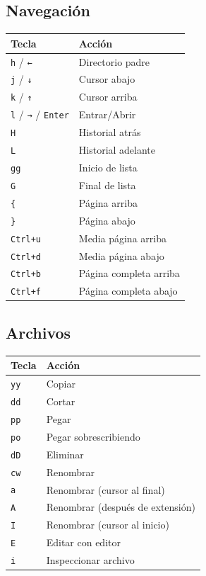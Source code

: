 \documentclass[
  doc,
  floatsintext,
  longtable,
  a4paper,
  nolmodern,
  notxfonts,
  notimes,
  12pt,
  colorlinks=true,linkcolor=blue,citecolor=blue,urlcolor=blue]{apa7}
\newcounter{none} %
\begin{document}
\subsection{Navegación}\label{navegaciuxf3n-1}

{\def\LTcaptype{none} %
\begin{longtable}[]{@{}ll@{}}
\toprule\noalign{}
Tecla & Acción \\
\midrule\noalign{}
\endhead
\bottomrule\noalign{}
\endlastfoot
\texttt{h} / \texttt{←} & Directorio padre \\
\texttt{j} / \texttt{↓} & Cursor abajo \\
\texttt{k} / \texttt{↑} & Cursor arriba \\
\texttt{l} / \texttt{→} / \texttt{Enter} & Entrar/Abrir \\
\texttt{H} & Historial atrás \\
\texttt{L} & Historial adelante \\
\texttt{gg} & Inicio de lista \\
\texttt{G} & Final de lista \\
\texttt{\{} & Página arriba \\
\texttt{\}} & Página abajo \\
\texttt{Ctrl+u} & Media página arriba \\
\texttt{Ctrl+d} & Media página abajo \\
\texttt{Ctrl+b} & Página completa arriba \\
\texttt{Ctrl+f} & Página completa abajo \\
\end{longtable}
}

\subsection{Archivos}\label{archivos}

{\def\LTcaptype{none} %
\begin{longtable}[]{@{}ll@{}}
\toprule\noalign{}
Tecla & Acción \\
\midrule\noalign{}
\endhead
\bottomrule\noalign{}
\endlastfoot
\texttt{yy} & Copiar \\
\texttt{dd} & Cortar \\
\texttt{pp} & Pegar \\
\texttt{po} & Pegar sobrescribiendo \\
\texttt{dD} & Eliminar \\
\texttt{cw} & Renombrar \\
\texttt{a} & Renombrar (cursor al final) \\
\texttt{A} & Renombrar (después de extensión) \\
\texttt{I} & Renombrar (cursor al inicio) \\
\texttt{E} & Editar con editor \\
\texttt{i} & Inspeccionar archivo \\
\end{longtable}
}
\end{document}

